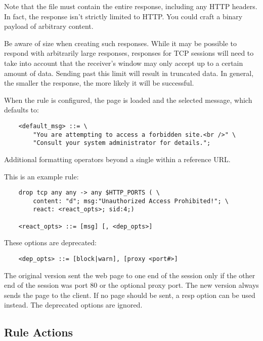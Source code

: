 \documentclass[english]{report}
\begin{document}
Note that the file must contain the entire response, including any HTTP headers.
In fact, the response isn't strictly limited to HTTP.  You could craft a binary
payload of arbitrary content.

Be aware of size when creating such responses. While it may be possible
to respond with arbitrarily large responses, responses for TCP sessions will need
to take into account that the receiver's window may only accept up to a certain
amount of data. Sending past this limit will result in truncated data. In general,
the smaller the response, the more likely it will be successful.

When the rule is configured, the page is loaded and the %
selected message, which defaults to:

\begin{verbatim}
    <default_msg> ::= \
        "You are attempting to access a forbidden site.<br />" \
        "Consult your system administrator for details.";
\end{verbatim}

Additional formatting operators beyond a single %
within a reference URL.

This is an example rule:

\begin{verbatim}
    drop tcp any any -> any $HTTP_PORTS ( \
        content: "d"; msg:"Unauthorized Access Prohibited!"; \
        react: <react_opts>; sid:4;)

    <react_opts> ::= [msg] [, <dep_opts>]
\end{verbatim}

These options are deprecated:

\begin{verbatim}
    <dep_opts> ::= [block|warn], [proxy <port#>]
\end{verbatim}

The original version sent the web page to one end of the session only if the
other end of the session was port 80 or the optional proxy port.  The new
version always sends the page to the client.  If no page should be sent, a resp
option can be used instead.  The deprecated options are ignored.

\subsection{Rule Actions}
\end{document}
